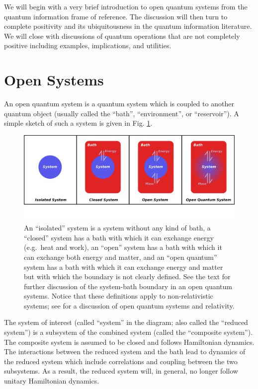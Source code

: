 We will begin with a very brief introduction to open quantum systems from the quantum information frame of reference.  The discussion will then turn to complete positivity and its ubiquitousness in the quantum information literature.  We will close with discussions of quantum operations that are not completely positive including examples, implications, and utilities.  

\section{Open Systems}
An open quantum system is a quantum system which is coupled to another quantum object (usually called the ``bath'', ``environment'', or ``reservoir'').  A simple sketch of such a system is given  in Fig. \ref{fig:sysbathdiagram}.

\begin{figure}[t!]
    \includegraphics[scale=0.65]{OpenSystemDiagram.png}
  \caption{An ``isolated'' system is a system without any kind of bath, a ``closed'' system has a bath with which it can exchange energy (e.g.\ heat and work), an ``open'' system has a bath with which it can exchange both energy and matter, and an ``open quantum'' system has a bath with which it can exchange energy and matter but with which the boundary is not clearly defined.  See the text for further discussion of the system-bath boundary in an open quantum systems.  Notice that these definitions apply to non-relativistic systems; see \cite{Breuer2007} for a discussion of open quantum systems and relativity.}
  \label{fig:sysbathdiagram}
\end{figure}

The system of interest (called ``system'' in the diagram; also called the ``reduced system'') is a subsystem of the combined system (called the ``composite system''). The composite system is assumed to be closed and follows Hamiltonian dynamics.  The interactions between the reduced system and the bath lead to dynamics of the reduced system which include correlations and coupling between the two subsystems.  As a result, the reduced system will, in general, no longer follow unitary Hamiltonian dynamics.   

